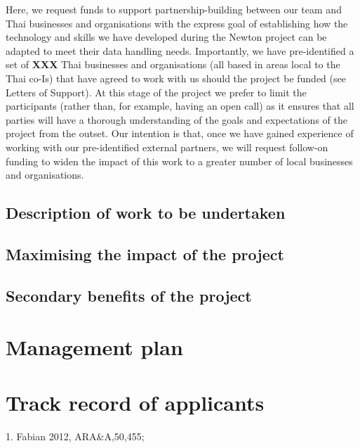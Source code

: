 \documentclass[11pt]{article}
\begin{document}
\vspace{2mm}
\noindent
Here, we request funds to support partnership-building between our team and Thai businesses and organisations with the express goal of establishing how the technology and skills we have developed during the Newton project can be adapted to meet their data handling needs. Importantly, we have pre-identified a set of {\bf XXX} Thai businesses and organisations (all based in areas local to the Thai co-Is) that have agreed to work with us should the project be funded (see Letters of Support). At this stage of the project we prefer to limit the participants (rather than, for example, having an open call) as it ensures that all parties will have a thorough understanding of the goals and expectations of the project from the outset. Our intention is that, once we have gained experience of working with our pre-identified external partners, we will request follow-on funding to widen the impact of this work to a greater number of local businesses and organisations.


\subsection{Description of work to be undertaken}

\subsection{Maximising the impact of the project}

\subsection{Secondary benefits of the project}

\section{Management plan}

\section{Track record of applicants}


\vspace{10mm}
 {\scriptsize 1. Fabian 2012,
  ARA\&A,50,455;
}
\end{document}
